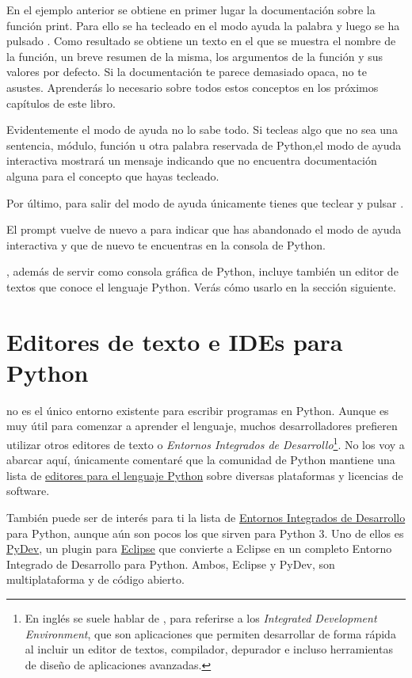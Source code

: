 En el ejemplo anterior se obtiene en primer lugar la documentación sobre la función print. Para ello se ha tecleado en el modo ayuda la palabra  y luego se ha pulsado . Como resultado se obtiene un texto en el que se muestra el nombre de la función, un breve resumen de la misma, los argumentos de la función y sus valores por defecto. Si la documentación te parece demasiado opaca, no te asustes. Aprenderás lo necesario sobre todos estos conceptos en los próximos capítulos de este libro.

Evidentemente el modo de ayuda no lo sabe todo. Si tecleas algo que no sea una sentencia, módulo, función u otra palabra reservada de Python,el modo de ayuda interactiva mostrará un mensaje indicando que no encuentra documentación alguna para el concepto que hayas tecleado.

Por último, para salir del modo de ayuda únicamente tienes que teclear  y pulsar .

El prompt vuelve de nuevo a \codigo{$>>>$} para indicar que has abandonado el modo de ayuda interactiva y que de nuevo te encuentras en la consola de Python.

, además de servir como consola gráfica de Python, incluye también un editor de textos que conoce el lenguaje Python. Verás cómo usarlo en la sección siguiente.

\section{Editores de texto e IDEs para Python}

 no es el único entorno existente para escribir programas en Python. Aunque es muy útil para comenzar a aprender el lenguaje, muchos desarrolladores prefieren utilizar otros editores de texto o \emph{Entornos Integrados de Desarrollo}\footnote{En inglés se suele hablar de , para referirse a los \emph{Integrated Development Environment}, que son aplicaciones que permiten desarrollar de forma rápida al incluir un editor de textos, compilador, depurador e incluso herramientas de diseño de aplicaciones avanzadas.}. No los voy a abarcar aquí, únicamente comentaré que la comunidad de Python mantiene una lista de \href{http://wiki.python.org/moin/PythonEditors}{editores para el lenguaje Python} sobre diversas plataformas y licencias de software.

También puede ser de interés para ti la lista de \href{http://wiki.python.org/moin/IntegratedDevelopmentEnvironments}{Entornos Integrados de Desarrollo} para Python, aunque aún son pocos los que sirven para Python 3. Uno de ellos es \href{http://pydev.sourceforge.net/}{PyDev}, un plugin para \href{http://eclipse.org/}{Eclipse} que convierte a Eclipse en un completo Entorno Integrado de Desarrollo para Python. Ambos, Eclipse y PyDev, son multiplataforma y de código abierto.

